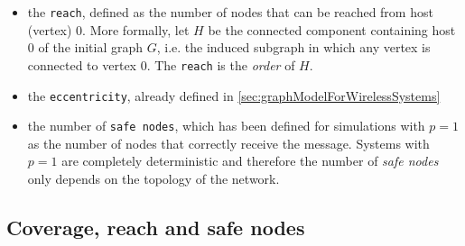 \begin{itemize}
	\item the \texttt{reach}, defined as the number of nodes that can be reached from host (vertex) 0. More formally, let $H$ be the connected component containing host 0 of the initial graph $G$, i.e. the induced subgraph in which any vertex is connected to vertex 0. The \texttt{reach} is the \textit{order} of $H$.
	\item the \texttt{eccentricity}, already defined in \ref{sec:graphModelForWirelessSystems}
	\item the number of \texttt{safe nodes}, which has been defined for simulations with $p=1$ as the number of nodes that correctly receive the message. Systems with $p=1$ are completely deterministic and therefore the number of \textit{safe nodes} only depends on the topology of the network.
\end{itemize}

\subsection{Coverage, reach and safe nodes}\label{ssec:coverageReachSafenodes}

